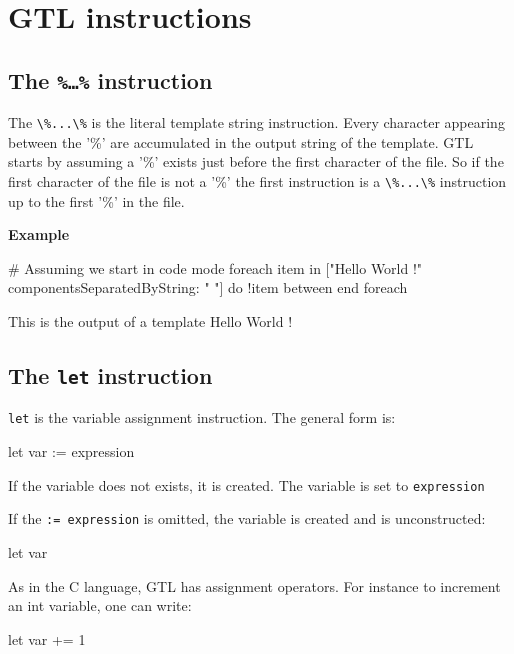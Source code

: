 \documentclass[10pt,openright,twosides,final]{memoir}
\newcommand{\gtltype}[1]{{\small\ttfamily #1}}
\newcommand{\ccst}[1]{{\footnotesize\ttfamily\colorbox{light-blue}{'#1'}}}
\newcommand{\gtlinline}[1]{\colorbox{light-blue}{\lstinline[language=gtl]{#1}}}
\newcommand{\example}{\vspace{.75em}\noindent\textbf{Example}\vspace{0em}}
\begin{document}
\chapter{GTL instructions}

\section{The \texttt{\%\ldots\%} instruction}

The \gtlinline{\%...\%} is the literal template string instruction. Every character appearing between the \ccst{\%} are accumulated in the output string of the template. GTL starts by assuming a \ccst{\%} exists just before the first character of the file. So if the first character of the file is not a \ccst{\%} the first instruction is a \gtlinline{\%...\%} instruction up to the first \ccst{\%} in the file. 

\example
\begin{gtl}
# Assuming we start in code mode
%
foreach item in ["Hello World !" componentsSeparatedByString: " "]
do
  !item
between%
%
end foreach%
%
\end{gtl}
\begin{templateoutput}
This is the output of a template
Hello
World
!
\end{templateoutput}

\section{The \texttt{let} instruction}

\gtlinline{let} is the variable assignment instruction. The general form is:

\begin{gtl}
let var := expression
\end{gtl}

If the variable does not exists, it is created. The variable is set to \gtlinline{expression}

If the \gtlinline{:= expression} is omitted, the variable is created and is \gtltype{unconstructed}:

\begin{gtl}
let var
\end{gtl}


As in the C language, GTL has assignment operators. For instance to increment an \gtltype{int} variable, one can write: 

\begin{gtl}
let var += 1
\end{gtl}
\end{document}
